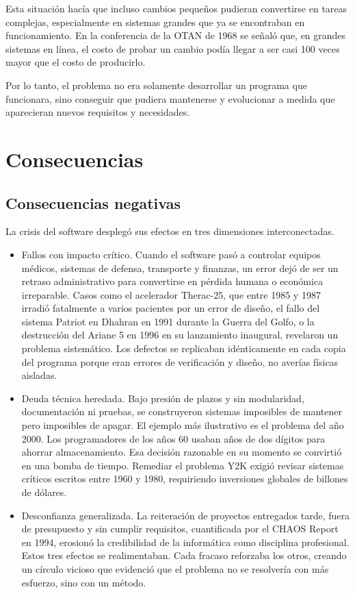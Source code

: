 \documentclass{./plantilla/umss}
\begin{document}
Esta situación hacía que incluso cambios pequeños pudieran convertirse en tareas complejas, especialmente en sistemas grandes que ya se encontraban en funcionamiento. En la conferencia de la OTAN de 1968 se señaló que, en grandes sistemas en línea, el costo de probar un cambio podía llegar a ser casi 100 veces mayor que el costo de producirlo.

Por lo tanto, el problema no era solamente desarrollar un programa que funcionara, sino conseguir que pudiera mantenerse y evolucionar a medida que aparecieran nuevos requisitos y necesidades.

\section{Consecuencias}

\subsection{Consecuencias negativas}

La crisis del software desplegó sus efectos en tres dimensiones interconectadas.

\begin{itemize}
    \item Fallos con impacto crítico. Cuando el software pasó a controlar equipos médicos, sistemas de defensa, transporte y finanzas, un error dejó de ser un retraso administrativo para convertirse en pérdida humana o económica irreparable. Casos como el acelerador Therac-25, que entre 1985 y 1987 irradió fatalmente a varios pacientes por un error de diseño, el fallo del sistema Patriot en Dhahran en 1991 durante la Guerra del Golfo, o la destrucción del Ariane 5 en 1996 en su lanzamiento inaugural, revelaron un problema sistemático. Los defectos se replicaban idénticamente en cada copia del programa porque eran errores de verificación y diseño, no averías físicas aisladas.
    \item Deuda técnica heredada. Bajo presión de plazos y sin modularidad, documentación ni pruebas, se construyeron sistemas imposibles de mantener pero imposibles de apagar. El ejemplo más ilustrativo es el problema del año 2000. Los programadores de los años 60 usaban años de dos dígitos para ahorrar almacenamiento. Esa decisión razonable en su momento se convirtió en una bomba de tiempo. Remediar el problema Y2K exigió revisar sistemas críticos escritos entre 1960 y 1980, requiriendo inversiones globales de billones de dólares.
    \item Desconfianza generalizada. La reiteración de proyectos entregados tarde, fuera de presupuesto y sin cumplir requisitos, cuantificada por el CHAOS Report en 1994, erosionó la credibilidad de la informática como disciplina profesional. Estos tres efectos se realimentaban. Cada fracaso reforzaba los otros, creando un círculo vicioso que evidenció que el problema no se resolvería con más esfuerzo, sino con un método.
\end{itemize}
\end{document}
